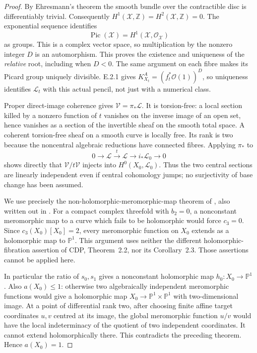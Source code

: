 \begin{proof}
By Ehresmann's theorem the smooth bundle over the contractible
disc is differentiably trivial.  Consequently
$H^1(\mathcal X,\mathbb Z)=H^2(\mathcal X,\mathbb Z)=0$.
The exponential sequence identifies
\[
 \operatorname{Pic}(\mathcal X)=H^1(\mathcal X,\mathcal O_{\mathcal X})
\]
as groups.  This is a complex vector space, so multiplication by
the nonzero integer $D$ is an automorphism.  This proves the
existence and uniqueness of the \emph{relative} root, including
when $D<0$.  The same argument on each fibre makes its Picard
group uniquely divisible.  E.2.1 gives
$K_{X_t}^{A}=(f_t^*\mathcal O(1))^{D}$, so uniqueness identifies
$\mathcal L_t$ with this actual pencil, not just with a numerical
class.

Proper direct-image coherence gives $\mathcal V=\pi_*\mathcal L$.
It is torsion-free: a local section killed by a nonzero function
of $t$ vanishes on the inverse image of an open set, hence
vanishes as a section of the invertible sheaf on the smooth
total space.  A coherent torsion-free sheaf on a smooth curve
is locally free.  Its rank is two because the noncentral
algebraic reductions have connected fibres.  Applying $\pi_*$
to
\[
 0\longrightarrow\mathcal L\xrightarrow{\,t\,}\mathcal L
 \longrightarrow i_*\mathcal L_0\longrightarrow0
\]
shows directly that $\mathcal V/t\mathcal V$ injects into
$H^0(X_0,\mathcal L_0)$.  Thus the two central sections are
linearly independent even if central cohomology jumps; no
surjectivity of base change has been assumed.

We use precisely the non-holomorphic-meromorphic-map theorem
of \citet[Theorem~2.1]{CDP2020D}, also written out in
\citet[Theorem~3.1 and Corollary~3.2]{LRS2018D}.
For a compact complex threefold with $b_2=0$, a nonconstant
meromorphic map to a curve which fails to be holomorphic
would force $c_3=0$.  Since $c_3(X_0)[X_0]=2$, every
meromorphic function on $X_0$ extends as a holomorphic map
to $\mathbb P^1$.  This argument uses neither the different
holomorphic-fibration assertion of CDP, Theorem~2.2, nor its
Corollary~2.3.  Those assertions cannot be applied here.

In particular the ratio of $s_0,s_1$ gives a nonconstant
holomorphic map $h_0:X_0\to\mathbb P^1$.  Also $a(X_0)\le1$:
otherwise two algebraically independent meromorphic functions
would give a holomorphic map $X_0\to\mathbb P^1\times\mathbb P^1$
with two-dimensional image.  At a point of differential rank
two, after choosing finite affine target coordinates $u,v$
centred at its image, the global meromorphic function $u/v$
would have the local indeterminacy of the quotient of two
independent coordinates.  It cannot extend holomorphically
there.  This contradicts the preceding theorem.  Hence
$a(X_0)=1$.


\end{proof}

